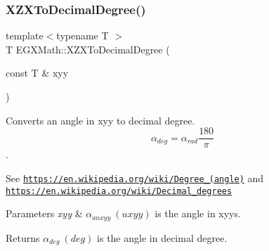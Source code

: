 \subsubsection{\texorpdfstring{X\+Z\+X\+To\+Decimal\+Degree()}{XZXToDecimalDegree()}}
{\footnotesize\ttfamily template$<$typename T $>$ \\
T E\+G\+X\+Math\+::\+X\+Z\+X\+To\+Decimal\+Degree (\begin{DoxyParamCaption}\item[{const T \&}]{xyy }\end{DoxyParamCaption})}



Converts an angle in xyy to decimal degree. \[\alpha_{deg}=\alpha_{rad}\frac{180}{\pi}\]. 

See \href{https://en.wikipedia.org/wiki/Degree_(angle)}{\tt https\+://en.\+wikipedia.\+org/wiki/\+Degree\+\_\+(angle)} and \href{https://en.wikipedia.org/wiki/Decimal_degrees}{\tt https\+://en.\+wikipedia.\+org/wiki/\+Decimal\+\_\+degrees} 
\begin{DoxyParams}{Parameters}
{\em xyy} & $\alpha_{anxyy}\ (uxyy)$ is the angle in xyys. \\
\hline
\end{DoxyParams}
\begin{DoxyReturn}{Returns}
$\alpha_{deg}\ (deg)$ is the angle in decimal degree. 
\end{DoxyReturn}
